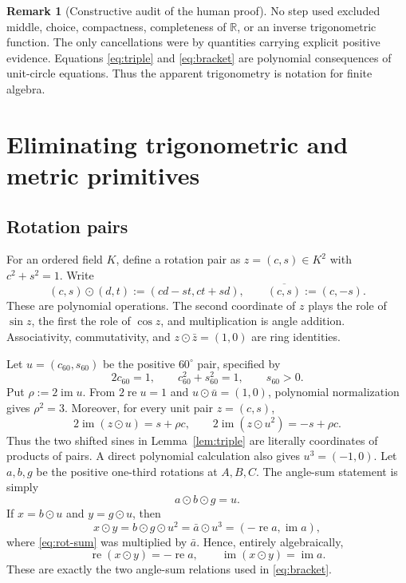\documentclass[11pt]{article}
\theoremstyle{definition}
\newtheorem{remark}[theorem]{Remark}
\newcommand{\R}{\mathbb R}
\newcommand{\rotmul}{\mathbin{\odot}}
\newcommand{\im}{\operatorname{im}}
\newcommand{\re}{\operatorname{re}}
\begin{document}
\begin{remark}[Constructive audit of the human proof]
No step used excluded middle, choice, compactness, completeness of $\R$, or an
inverse trigonometric function.  The only cancellations were by quantities
carrying explicit positive evidence.  Equations \eqref{eq:triple} and
\eqref{eq:bracket} are polynomial consequences of unit-circle equations.
Thus the apparent trigonometry is notation for finite algebra.
\end{remark}

\section{Eliminating trigonometric and metric primitives}
\label{sec:algebraization}

\subsection{Rotation pairs}
For an ordered field $K$, define a rotation pair as $z=(c,s)\in K^2$ with
$c^2+s^2=1$.  Write
\[
 (c,s)\rotmul(d,t):=(cd-st,ct+sd),
 \qquad \overline{(c,s)}:=(c,-s).
\]
These are polynomial operations.  The second coordinate of $z$ plays the role
of $\sin z$, the first the role of $\cos z$, and multiplication is angle
addition.  Associativity, commutativity, and
$z\rotmul\bar z=(1,0)$ are ring identities.

Let $u=(c_{60},s_{60})$ be the positive $60^\circ$ pair, specified by
\[
 2c_{60}=1,\qquad c_{60}^2+s_{60}^2=1,\qquad s_{60}>0.
 \tag{3.1}\label{eq:u60}
\]
Put $\rho:=2\im u$.  From $2\re u=1$ and $u\rotmul\bar u=(1,0)$,
polynomial normalization gives $\rho^2=3$.  Moreover, for every unit pair
$z=(c,s)$,
\[
 2\im(z\rotmul u)=s+\rho c,
 \qquad
 2\im(z\rotmul u^2)=-s+\rho c.
 \tag{3.2}\label{eq:shift-pairs}
\]
Thus the two shifted sines in Lemma~\ref{lem:triple} are literally coordinates
of products of pairs.  A direct polynomial calculation also gives
$u^3=(-1,0)$.  Let $a,b,g$ be the positive one-third rotations at $A,B,C$.
The angle-sum statement is simply
\[
 a\rotmul b\rotmul g=u.
 \tag{3.3}\label{eq:rot-sum}
\]
If $x=b\rotmul u$ and $y=g\rotmul u$, then
\[
 x\rotmul y=b\rotmul g\rotmul u^2
 =\bar a\rotmul u^3=(-\re a,\im a),
\]
where \eqref{eq:rot-sum} was multiplied by $\bar a$.  Hence, entirely
algebraically,
\[
 \re(x\rotmul y)=-\re a,
 \qquad \im(x\rotmul y)=\im a.
 \tag{3.4}\label{eq:sum-pair}
\]
These are exactly the two angle-sum relations used in
\eqref{eq:bracket}.
\end{document}
